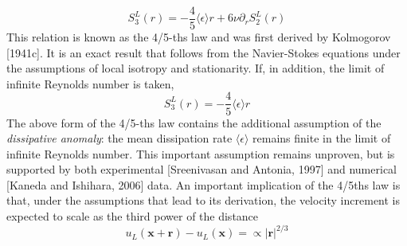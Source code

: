 \begin{equation}
    S_3^L(r)=-\frac{4}{5}\langle\epsilon\rangle r+6\nu\partial_rS_2^L(r)
\end{equation}
This relation is known as the 4/5-ths law and was first derived by Kolmogorov [1941c]. It is an exact result that follows from the Navier-Stokes equations under the assumptions of local isotropy and stationarity. If, in addition, the limit of infinite Reynolds number is taken,
\begin{equation}
    S_3^L(r)=-\frac{4}{5}\langle\epsilon\rangle r
\end{equation}
The above form of the 4/5-ths law contains the additional assumption of the \emph{dissipative anomaly}: the mean dissipation rate $\langle\epsilon\rangle$ remains finite in the limit of infinite Reynolds number. This important assumption remains unproven, but is supported by both experimental [Sreenivasan and Antonia, 1997] and numerical [Kaneda and Ishihara, 2006] data. An important implication of the 4/5ths law is that, under the assumptions that lead to its derivation, the velocity increment is expected to scale as the third power of the distance
\begin{equation}
    u_L(\mathbf{x}+\mathbf{r})-u_L(\mathbf{x})=\propto|\mathbf{r}|^{2/3}
\end{equation}

